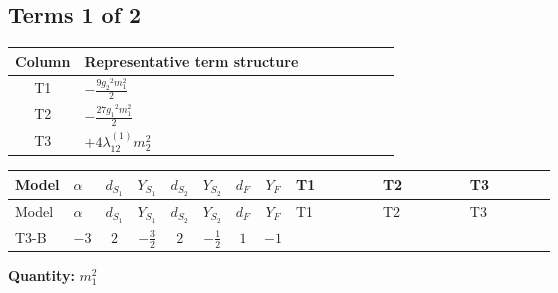 \documentclass[8pt]{article}
\begin{document}
\begin{landscape}
\subsection*{Terms 1 of 2}
\begin{center}
\begin{tabular}{@{}c >{\raggedright\arraybackslash}p{0.82\linewidth}@{}}
\toprule
Column & Representative term structure \\
\midrule
T1 & \(\displaystyle -\frac{9 {g_2}^2 {m_1^2}}{2}\) \\
\midrule
T2 & \(\displaystyle -\frac{27 {g_1}^2 {m_1^2}}{2}\) \\
\midrule
T3 & \(\displaystyle +4 {\lambda_{12}^{(1)}} {m_2^2}\) \\
\midrule
\bottomrule
\end{tabular}
\end{center}
\smallskip
\tiny
\begin{longtable}{@{}llcccccc >{\raggedright\arraybackslash}p{0.21\linewidth} >{\raggedright\arraybackslash}p{0.21\linewidth} >{\raggedright\arraybackslash}p{0.21\linewidth}@{}}
\toprule
Model & $\alpha$ & $d_{S_1}$ & $Y_{S_1}$ & $d_{S_2}$ & $Y_{S_2}$ & $d_F$ & $Y_F$ & T1 & T2 & T3 \\
\midrule
\endfirsthead
\toprule
Model & $\alpha$ & $d_{S_1}$ & $Y_{S_1}$ & $d_{S_2}$ & $Y_{S_2}$ & $d_F$ & $Y_F$ & T1 & T2 & T3 \\
\midrule
\endhead
T3-B & $-3$ & $2$ & $-\frac{3}{2}$ & $2$ & $-\frac{1}{2}$ & $1$ & $-1$ & \scriptsize\adjustbox{max width=\linewidth}{$\begin{gathered} -\frac{9 {g_2}^2 {m_1^2}}{2}\end{gathered}$} & \scriptsize\adjustbox{max width=\linewidth}{$\begin{gathered} -\frac{27 {g_1}^2 {m_1^2}}{2}\end{gathered}$} & \scriptsize\adjustbox{max width=\linewidth}{$\begin{gathered} +4 {\lambda_{12}^{(1)}} {m_2^2}\end{gathered}$} \\
\midrule
\bottomrule
\end{longtable}
\clearpage
\noindent\textbf{Quantity: }$m_1^2$\par\smallskip

\end{landscape}
\end{document}
